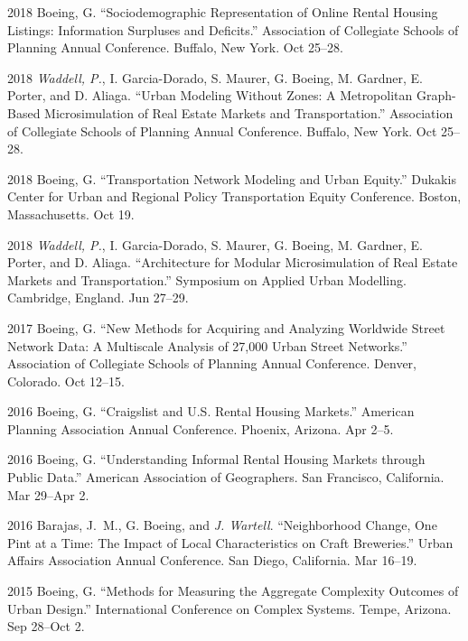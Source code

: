 \documentclass[12pt,letterpaper]{report}
\begin{document}
\begin{tablist}
		\item[2018] \tab Boeing, G. \enquote{Sociodemographic Representation of Online Rental Housing Listings: Information Surpluses and Deficits.} Association of Collegiate Schools of Planning Annual Conference. Buffalo, New York. Oct 25--28.

		\item[2018] \tab \textit{Waddell, P.}, I. Garcia-Dorado, S. Maurer, G. Boeing, M. Gardner, E. Porter, and D. Aliaga. \enquote{Urban Modeling Without Zones: A Metropolitan Graph-Based Microsimulation of Real Estate Markets and Transportation.} Association of Collegiate Schools of Planning Annual Conference. Buffalo, New York. Oct 25--28.

		\item[2018] \tab Boeing, G. \enquote{Transportation Network Modeling and Urban Equity.} Dukakis Center for Urban and Regional Policy Transportation Equity Conference. Boston, Massachusetts. Oct 19.

		\item[2018] \tab \textit{Waddell, P.}, I. Garcia-Dorado, S. Maurer, G. Boeing, M. Gardner, E. Porter, and D. Aliaga. \enquote{Architecture for Modular Microsimulation of Real Estate Markets and Transportation.} Symposium on Applied Urban Modelling. Cambridge, England. Jun 27--29.

		\item[2017] \tab Boeing, G. \enquote{New Methods for Acquiring and Analyzing Worldwide Street Network Data: A Multiscale Analysis of 27,000 Urban Street Networks.} Association of Collegiate Schools of Planning Annual Conference. Denver, Colorado. Oct 12--15.

		\item[2016] \tab Boeing, G. \enquote{Craigslist and U.S. Rental Housing Markets.} American Planning Association Annual Conference. Phoenix, Arizona. Apr 2--5.

		\item[2016] \tab Boeing, G. \enquote{Understanding Informal Rental Housing Markets through Public Data.} American Association of Geographers. San Francisco, California. Mar 29--Apr 2.

		\item[2016] \tab Barajas, J.~M., G. Boeing, and \textit{J. Wartell}. \enquote{Neighborhood Change, One Pint at a Time: The Impact of Local Characteristics on Craft Breweries.} Urban Affairs Association Annual Conference. San Diego, California. Mar 16--19.

		\item[2015] \tab Boeing, G. \enquote{Methods for Measuring the Aggregate Complexity Outcomes of Urban Design.} International Conference on Complex Systems. Tempe, Arizona. Sep 28--Oct 2.


\end{tablist}
\end{document}
